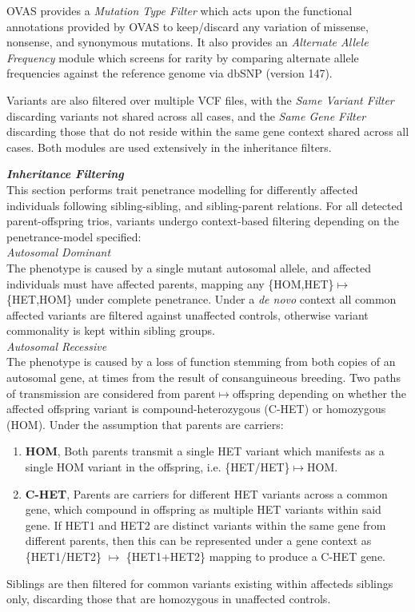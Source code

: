 \documentclass[twocolumn]{bmcart}%
\newcommand{\triplesub}[2]{\noindent\textsl{#1}\\#2\\}  %
\begin{document}
{{OVAS provides a \textit{Mutation Type Filter} which acts upon the functional annotations provided by OVAS to keep/discard any variation of missense, nonsense, and synonymous mutations. It also provides an \textit{Alternate Allele Frequency} module which screens for rarity by comparing alternate allele frequencies against the reference genome via dbSNP (version 147).

Variants are also filtered over multiple VCF files, with the \textit{Same Variant Filter} discarding variants not shared across all cases, and the \textit{Same Gene Filter} discarding those that do not reside within the same gene context shared across all cases. Both modules are used extensively in the inheritance filters.
}}

\triplesub{\bf Inheritance Filtering}{
This section performs trait penetrance modelling for differently affected individuals following sibling-sibling, and sibling-parent relations. For all detected parent-offspring trios, variants undergo context-based filtering depending on the penetrance-model specified:\\

	\triplesub{Autosomal Dominant}{The phenotype is caused by a single mutant autosomal allele, and affected individuals must have affected parents, mapping any \{HOM,HET\}$\mapsto$\{HET,HOM\} under complete penetrance. Under a \textit{de novo} context all common affected variants are filtered against unaffected controls, otherwise variant commonality is kept within sibling groups.}

	\triplesub{Autosomal Recessive}{
The phenotype is caused by a loss of function stemming from both copies of an autosomal gene, at times from the result of consanguineous breeding. Two paths of transmission are considered from parent$\mapsto$offspring depending on whether the affected offspring variant is compound-heterozygous (C-HET) or homozygous (HOM). Under the assumption that parents are carriers:\\
	\begin{enumerate}
\item{\bf HOM}{, Both parents transmit a single HET variant which manifests as a single HOM variant in the offspring, i.e. \{HET/HET\}$\mapsto$HOM.}
\item{\bf C-HET}{, Parents are carriers for different HET variants across a common gene, which compound in offspring as multiple HET variants within said gene. If HET1 and HET2 are distinct variants within the same gene from different parents, then this can be represented under a gene context as \{HET1/HET2\} $\mapsto$ \{HET1+HET2\} mapping to produce a C-HET gene.}
	\end{enumerate}
	\vspace{5pt}
Siblings are then filtered for common variants existing within affecteds siblings only, discarding those that are homozygous in unaffected controls.

}}
\end{document}
